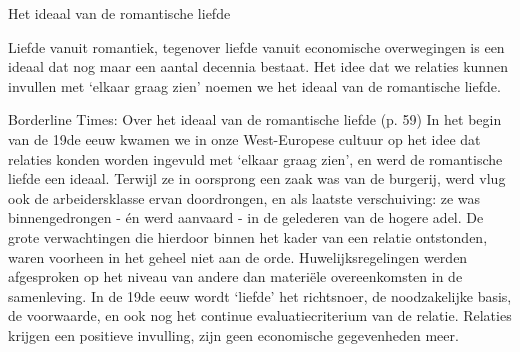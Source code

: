 \documentclass[main.tex]{subfiles}
\begin{document}
\begin{examenvraag}
    \begin{vraag}
        Het ideaal van de romantische liefde
    \end{vraag}

    \begin{antwoord}
        Liefde vanuit romantiek, tegenover liefde vanuit economische overwegingen is een ideaal dat nog maar een aantal decennia bestaat.
        Het idee dat we relaties kunnen invullen met `elkaar graag zien' noemen we het ideaal van de romantische liefde.
        \begin{citaat}{Borderline Times: Over het ideaal van de romantische liefde (p. 59)}
            In het begin van de 19de eeuw kwamen we in onze West-Europese cultuur op het idee dat relaties konden worden ingevuld met ‘elkaar graag zien’, en werd de romantische liefde een ideaal.
            Terwijl ze in oorsprong een zaak was van de burgerij, werd vlug ook de arbeidersklasse ervan doordrongen, en als laatste verschuiving: ze was binnengedrongen - én werd aanvaard - in de gelederen van de hogere adel.
            De grote verwachtingen die hierdoor binnen het kader van een relatie ontstonden, waren voorheen in het geheel niet aan de orde. Huwelijksregelingen werden afgesproken op het niveau van andere dan materiële overeenkomsten in de samenleving.
            In de 19de eeuw wordt ‘liefde’ het richtsnoer, de noodzakelijke basis, de voorwaarde, en ook nog het continue evaluatiecriterium van de relatie.
            Relaties krijgen een positieve invulling, zijn geen economische gegevenheden meer.
        \end{citaat}
    \end{antwoord}
\end{examenvraag}
\end{document}
